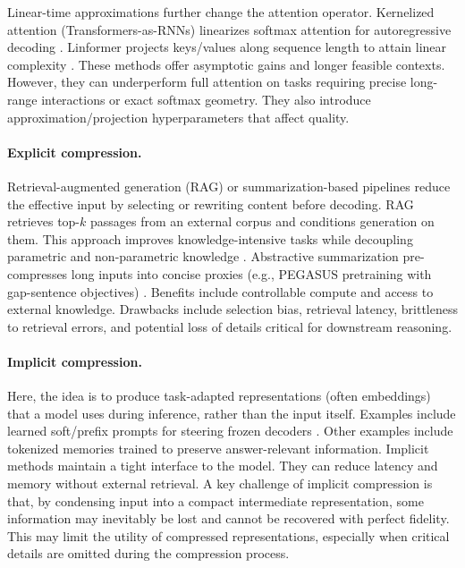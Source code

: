 Linear-time approximations further change the attention operator.
Kernelized attention (Transformers-as-RNNs) linearizes softmax attention for autoregressive decoding \cite{katharopoulos_transformers_2020}.
Linformer projects keys/values along sequence length to attain linear complexity \cite{wang_linformer_2020}.
These methods offer asymptotic gains and longer feasible contexts.
However, they can underperform full attention on tasks requiring precise long-range interactions or exact softmax geometry.
They also introduce approximation/projection hyperparameters that affect quality.

\paragraph{Explicit compression.}
Retrieval-augmented generation (RAG) or summarization-based pipelines reduce the effective input by selecting or rewriting content before decoding.
RAG retrieves top-$k$ passages from an external corpus and conditions generation on them.
This approach improves knowledge-intensive tasks while decoupling parametric and non-parametric knowledge \cite{lewis_rag_2020}.
Abstractive summarization pre-compresses long inputs into concise proxies (e.g., PEGASUS pretraining with gap-sentence objectives) \cite{zhang_pegasus_2020}.
Benefits include controllable compute and access to external knowledge.
Drawbacks include selection bias, retrieval latency, brittleness to retrieval errors, and potential loss of details critical for downstream reasoning.

\paragraph{Implicit compression.}
Here, the idea is to produce task-adapted representations (often embeddings) that a model uses during inference, rather than the input itself.
Examples include learned soft/prefix prompts for steering frozen decoders \cite{li_prefix_2021,lester_prompt_2021}.
Other examples include tokenized memories trained to preserve answer-relevant information.
Implicit methods maintain a tight interface to the model.
They can reduce latency and memory without external retrieval.
A key challenge of implicit compression is that, by condensing input into a compact intermediate representation, some information may inevitably be lost and cannot be recovered with perfect fidelity. 
This may limit the utility of compressed representations, especially when critical details are omitted during the compression process.

